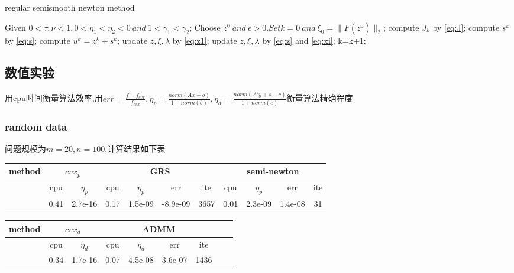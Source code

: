 \documentclass[UTF8]{ctexart}
\begin{document}
\begin{algorithm}[htb]
\caption{regular semismooth newton method}
\begin{algorithmic}[1]
    \State Given $0<\tau,\nu<1,0<\eta_1<\eta_2<0\ and\ 1<\gamma_1<\gamma_2$;
    \State Choose $z^0\ and\ \epsilon>0.Set k=0\ and\ \xi_0=\|F(z^0)\|_2$;
        \State compute $J_k$ by \ref{eq:J};
        \State compute $s^k$ by \ref{eq:s};
        \State compute $u^k=z^k+s^k$;
            \State update $z,\xi,\lambda$ by \ref{eq:z1};
        \Else
            \State update $z,\xi,\lambda$ by \ref{eq:z} and \ref{eq:xi};
        \EndIf
        \State k=k+1;
    \EndWhile
\end{algorithmic}
\end{algorithm}

\subsection{数值实验}
用cpu时间衡量算法效率,用$err=\frac{f-f_{cvx}}{f_{cvx}},\eta_p=\frac{norm(Ax-b)}{1+norm(b)},\eta_d=\frac{norm(A'y+s-c)}{1+norm(c)}$衡量算法精确程度
\subsubsection{random data}
问题规模为$m=20,n=100$,计算结果如下表\\
\begin{tabular}{|c|c|c|c|c|c|c|c|c|c|c|}
  \hline
  method& \multicolumn{2}{c|}{$cvx_p$} &\multicolumn{4}{c|}{GRS} &\multicolumn{4}{c|}{semi-newton}\\
  \hline
  &cpu&$\eta_p$&cpu&$\eta_p$&err&ite&cpu&$\eta_p$&err&ite\\
  \hline
  &0.41 & 2.7e-16 & 0.17 & 1.5e-09 & -8.9e-09 & 3657& 0.01 & 2.3e-09 & 1.4e-08 & 31\\
  \hline
\end{tabular}
\begin{tabular}{|c|c|c|c|c|c|c|c|c|}
  \hline
  method& \multicolumn{2}{c|}{$cvx_d$} &\multicolumn{4}{c|}{ADMM}\\
  \hline
  &cpu&$\eta_d$&cpu&$\eta_d$&err&ite\\
  \hline
  & 0.34 & 1.7e-16 & 0.07 & 4.5e-08 & 3.6e-07 & 1436\\
  \hline
\end{tabular}
\end{document}
